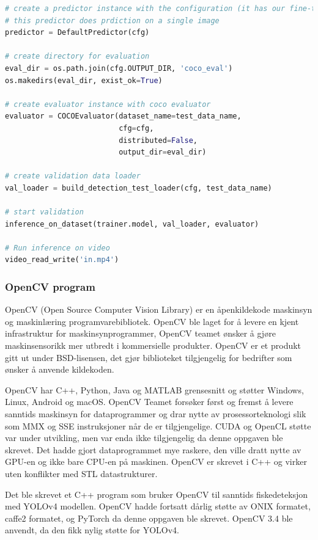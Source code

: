 \begin{lstlisting}[language=Python, caption=Inferens RetinaNet i inference.py]
# create a predictor instance with the configuration (it has our fine-tuned model)
# this predictor does prdiction on a single image
predictor = DefaultPredictor(cfg)

# create directory for evaluation
eval_dir = os.path.join(cfg.OUTPUT_DIR, 'coco_eval')
os.makedirs(eval_dir, exist_ok=True)

# create evaluator instance with coco evaluator
evaluator = COCOEvaluator(dataset_name=test_data_name,
                          cfg=cfg,
                          distributed=False,
                          output_dir=eval_dir)

# create validation data loader
val_loader = build_detection_test_loader(cfg, test_data_name)

# start validation 
inference_on_dataset(trainer.model, val_loader, evaluator)

# Run inference on video
video_read_write('in.mp4')
\end{lstlisting}

\subsubsection{OpenCV program} \label{part:opencv}

OpenCV (Open Source Computer Vision Library) er en åpenkildekode maskinsyn og maskinlæring programvarebibliotek. OpenCV ble laget for å levere en kjent infrastruktur for maskinsynprogrammer, OpenCV teamet ønsker å gjøre maskinsensorikk mer utbredt i kommersielle produkter. OpenCV er et produkt gitt ut under BSD-lisensen, det gjør biblioteket tilgjengelig for bedrifter som ønsker å anvende kildekoden. \cite{OpenCV Team 2020}

OpenCV har C++, Python, Java og MATLAB grensesnitt og støtter Windows, Linux, Android og macOS. OpenCV Teamet forsøker først og fremst å levere sanntids maskinsyn for dataprogrammer og drar nytte av prosessorteknologi slik som MMX og SSE instruksjoner når de er tilgjengelige. CUDA og OpenCL støtte var under utvikling, men var enda ikke tilgjengelig da denne oppgaven ble skrevet. Det hadde gjort dataprogrammet mye raskere, den ville dratt nytte av GPU-en og ikke bare CPU-en på maskinen. OpenCV er skrevet i C++ og virker uten konflikter med STL datastrukturer. \cite{OpenCV Team 2020}

Det ble skrevet et C++ program som bruker OpenCV til sanntids fiskedeteksjon med YOLOv4 modellen. OpenCV hadde fortsatt dårlig støtte av ONIX formatet, caffe2 formatet, og PyTorch da denne oppgaven ble skrevet. OpenCV 3.4 ble anvendt, da den fikk nylig støtte for YOLOv4. \cite{Batanina 2020}

